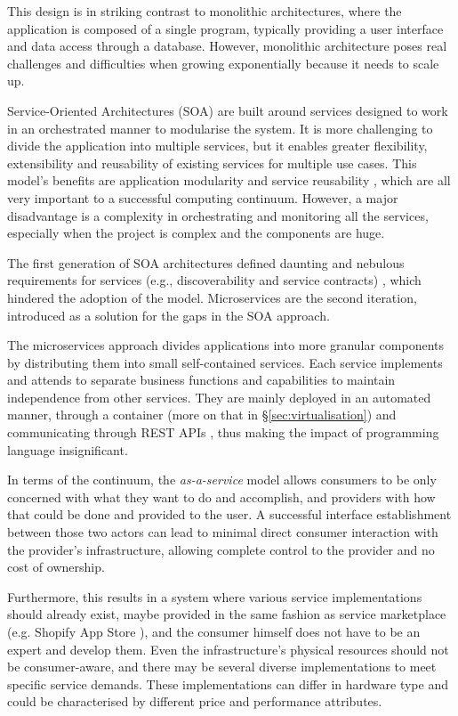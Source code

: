 \documentclass{ieeeaccess}
\begin{document}
This design is in striking contrast to monolithic architectures, where the application is composed of a single program, typically providing a user interface and data access through a database. However, monolithic architecture poses real challenges and difficulties when growing exponentially because it needs to scale up.

Service-Oriented Architectures (SOA) are built around services designed to work in an orchestrated manner to modularise the system. It is more challenging to divide the application into multiple services, but it enables greater flexibility, extensibility and reusability of existing services for multiple use cases. This model's benefits are application modularity and service reusability \cite{cloud-to-thing}, which are all very important to a successful computing continuum. However, a major disadvantage is a complexity in orchestrating and monitoring all the services, especially when the project is complex and the components are huge.

The first generation of SOA architectures defined daunting and nebulous requirements for services (e.g., discoverability and service contracts) \cite{microservices-today}, which hindered the adoption of the model. Microservices are the second iteration, introduced as a solution for the gaps in the SOA approach.

The microservices approach divides applications into more granular components by distributing them into small self-contained services. Each service implements and attends to separate business functions and capabilities to maintain independence from other services. They are mainly deployed in an automated manner, through a container (more on that in §\ref{sec:virtualisation}) and communicating through REST APIs \cite{rest}, thus making the impact of programming language insignificant.

In terms of the continuum, the \emph{as-a-service} model allows consumers to be only concerned with what they want to do and accomplish, and providers with how that could be done and provided to the user. A successful interface establishment between those two actors can lead to minimal direct consumer interaction with the provider's infrastructure, allowing complete control to the provider and no cost of ownership.

Furthermore, this results in a system where various service implementations should already exist, maybe provided in the same fashion as service marketplace (e.g. Shopify App Store \cite{shopify}), and the consumer himself does not have to be an expert and develop them. Even the infrastructure's physical resources should not be consumer-aware, and there may be several diverse implementations to meet specific service demands. These implementations can differ in hardware type and could be characterised by different price and performance attributes.
\end{document}
